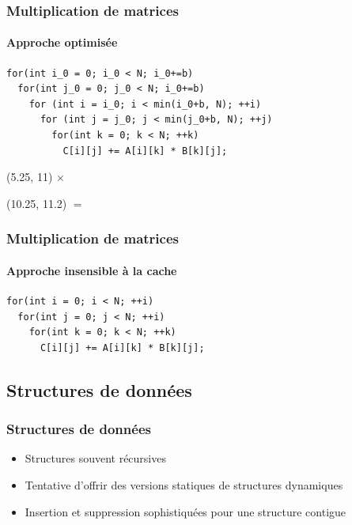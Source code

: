 \documentclass{beamer}
\begin{document}
\begin{frame}[fragile]
\frametitle{Multiplication de matrices}
\framesubtitle{Approche optimisée}
\begin{lstlisting}
for(int i_0 = 0; i_0 < N; i_0+=b)
  for(int j_0 = 0; j_0 < N; i_0+=b)
    for (int i = i_0; i < min(i_0+b, N); ++i)
      for (int j = j_0; j < min(j_0+b, N); ++j)
        for(int k = 0; k < N; ++k)
          C[i][j] += A[i][k] * B[k][j];
\end{lstlisting}


\begin{textblock}{5}(5.25, 11)
	 \Huge{$\times$}
\end{textblock}

\begin{textblock}{5}(10.25, 11.2)
	 \Huge{$=$}
\end{textblock}
\end{frame}

\begin{frame}[fragile]
\frametitle{Multiplication de matrices}
\framesubtitle{Approche insensible à la cache}
\begin{lstlisting}
for(int i = 0; i < N; ++i)
  for(int j = 0; j < N; ++i)
    for(int k = 0; k < N; ++k)
      C[i][j] += A[i][k] * B[k][j];
\end{lstlisting}
\end{frame}

\subsection{Structures de données}
\begin{frame}
\frametitle{Structures de données}
\begin{itemize}
\item Structures souvent récursives
\item Tentative d'offrir des versions statiques de structures dynamiques
\item Insertion et suppression sophistiquées pour une structure contigue
\end{itemize}
\end{frame}
\end{document}
